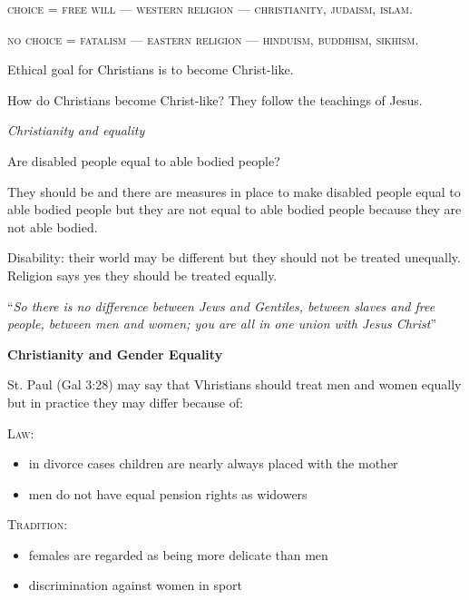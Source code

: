 \documentclass{article}
\begin{document}
\textsc{choice} = \textsc{free will} --- \textsc{western religion} --- \textsc{christianity, judaism, islam.}

\textsc{no choice} = \textsc{fatalism} --- \textsc{eastern religion} --- \textsc{hinduism, buddhism, sikhism.}

Ethical goal for Christians is to become Christ-like.

How do Christians become Christ-like?  They follow the teachings of Jesus.


\textsl{Christianity and equality}

Are disabled people equal to able bodied people?

They should be and there are measures in place to make disabled people equal to able bodied people but they are not equal to able bodied people because they are not able bodied.

Disability: their world may be different but they should not be treated unequally.
Religion says yes they should be treated equally.

``\textsl{So there is no difference between Jews and Gentiles, between slaves and free people, between men and women; you are all in one union with Jesus Christ}''

\textbf{Christianity and Gender Equality}

St. Paul (Gal 3:28) may say that Vhristians should treat men and women equally but in practice they may differ because of:

\textsc{Law:}
\begin{itemize}
\item{in divorce cases children are nearly always placed with the mother}
\item{men do not have equal pension rights as widowers}
\end{itemize}

\textsc{Tradition:}
\begin{itemize}
\item{females are regarded as being more delicate than men}
\item{discrimination against women in sport}
\end{itemize}
\end{document}

